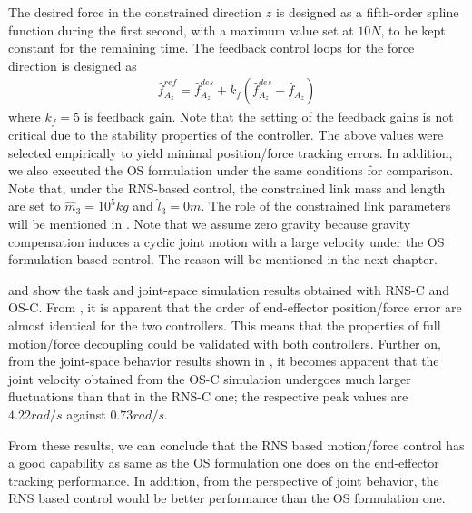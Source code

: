The desired force in the constrained direction $z$ is designed as a fifth-order spline function during the first second,
with a maximum value set at $10\unit{N}$, to be kept constant for the remaining time.
The feedback control loops for the force direction is designed as
%
\begin{align}
  \hat{f}_{A_{z}}^{ref} = \hat{f}_{A_{z}}^{des} + k_{f}(\hat{f}_{A_{z}}^{des} - \hat{f}_{A_{z}})
\end{align}
%
where $k_{f} = 5$ is feedback gain.
Note that the setting of the feedback gains is not critical due to the stability properties of the controller.
The above values were selected empirically to yield minimal position/force tracking errors.
In addition,
we also executed the OS formulation under the same conditions for comparison.
Note that, under the RNS-based control,
the constrained link mass and length are set to $\hat{m}_{3} = 10^5\unit{kg}$ and $\hat{l}_{3} = 0\unit{m}$.
The role of the constrained link parameters will be mentioned in .
Note that we assume zero gravity because gravity compensation induces a cyclic joint motion with a large velocity
under the OS formulation based control.
The reason will be mentioned in the next chapter.

 and  show the task and joint-space simulation results obtained
with RNS-C and OS-C.
From , it is apparent that the order of end-effector
position/force error are almost identical for the two controllers.
This means that the properties of full motion/force decoupling could be validated with both controllers.
Further on, from the joint-space behavior results shown in ,
it becomes apparent that the joint velocity obtained from the OS-C simulation undergoes much larger fluctuations than
that in the RNS-C one;
the respective peak values are $4.22\unit{rad/s}$ against $0.73\unit{rad/s}$.

From these results, we can conclude that the RNS based motion/force control
has a good capability as same as the OS formulation one does on the end-effector tracking performance.
In addition, from the perspective of joint behavior,
the RNS based control would be better performance than the OS formulation one.


